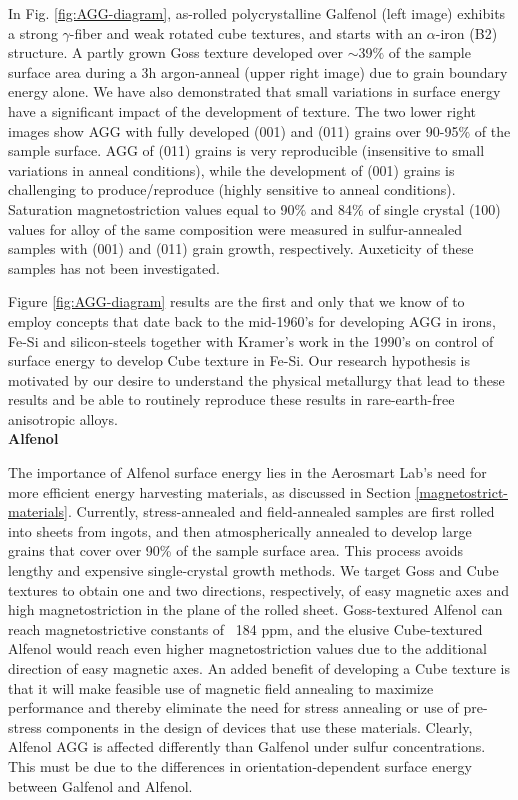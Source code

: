 In Fig. \ref{fig:AGG-diagram}, as-rolled polycrystalline Galfenol (left image) exhibits a strong $\gamma$-fiber and weak rotated cube textures, and starts with an $\alpha$-iron (B2) structure. A partly grown Goss texture developed over $\sim$39$\%$ of the sample surface area during a 3h argon-anneal (upper right image) due to grain boundary energy alone. We have also demonstrated that small variations in surface energy have a significant impact of the development of texture.\cite{Chun2010,Na2012b} The two lower right images show AGG with fully developed \hkl(001) and \hkl(011) grains over 90-95$ \% $ of the sample surface. AGG of (011) grains is very reproducible (insensitive to small variations in anneal conditions), while the development of (001) grains is challenging to produce/reproduce (highly sensitive to anneal conditions). Saturation magnetostriction values equal to 90$ \% $ and 84$ \% $ of single crystal \hkl(100) values for alloy of the same composition were measured in sulfur-annealed samples with \hkl(001) and \hkl(011) grain growth, respectively. Auxeticity of these samples has not been investigated. 


Figure \ref{fig:AGG-diagram} results are the first and only that we know of to employ concepts that date back to the mid-1960’s \cite{Walter1965,dunn1962surface,waeckerle1993effect} for developing AGG in irons, Fe-Si and silicon-steels together with Kramer’s work in the 1990’s\cite{Kramer1992} on control of surface energy to develop Cube texture in Fe-Si. Our research hypothesis is motivated by our desire to understand the physical metallurgy that lead to these results and be able to routinely reproduce these results in rare-earth-free anisotropic alloys. \\
\textbf{Alfenol}

The importance of Alfenol surface energy lies in the Aerosmart Lab's need for more efficient energy harvesting materials, as discussed in Section \ref{magnetostrict-materials}. Currently, stress-annealed and field-annealed samples are first rolled into sheets from ingots, and then atmospherically annealed to develop large grains that cover over 90\% of the sample surface area. This process avoids lengthy and expensive single-crystal growth methods. We target Goss  and Cube  textures to obtain one and two directions, respectively, of easy magnetic axes and high magnetostriction in the plane of the rolled sheet. Goss-textured Alfenol can reach magnetostrictive constants of ~184 ppm, and the elusive Cube-textured Alfenol would reach even higher magnetostriction values due to the additional direction of easy magnetic axes. An added benefit of developing a Cube texture is that it will make feasible use of magnetic field annealing to maximize performance\cite{Yoo2009,Yoo2008} and thereby eliminate the need for stress annealing or use of pre-stress components in the design of devices that use these materials\cite{Restorff2006,Summers2009}. Clearly, Alfenol AGG is affected differently than Galfenol under sulfur concentrations. This must be due to the differences in orientation-dependent surface energy between Galfenol and Alfenol.
	
